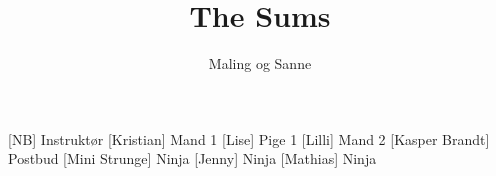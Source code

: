 \documentclass[a4paper,11pt]{article}
\title{The Sums}
\author{Maling og Sanne}
\begin{document}
	\maketitle
	
	\begin{roles}
[NB] Instruktør
[Kristian] Mand 1
	    [Lise] Pige 1
		[Lilli] Mand 2
     	[Kasper Brandt] Postbud
     	[Mini Strunge] Ninja
     	[Jenny] Ninja
     	[Mathias] Ninja
		
	\end{roles}
	
	
	
\end{document}
